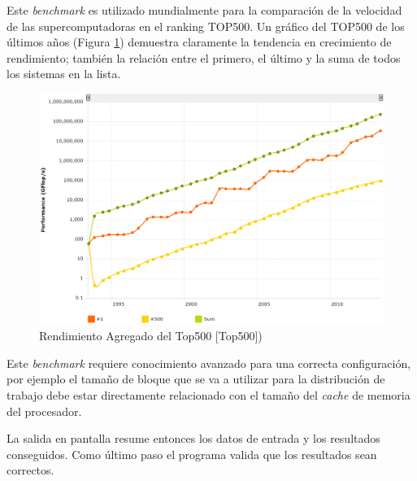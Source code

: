 \documentclass[a4paper]{report}
\begin{document}
\bigskip

Este {\it benchmark} es utilizado mundialmente para la comparación de la
velocidad de las supercomputadoras en el ranking TOP500. 
Un gráfico del TOP500 de los últimos años (Figura \ref{fig:top500}) demuestra claramente la
tendencia en crecimiento de rendimiento; también la relación entre el primero,
el último y la suma de todos los sistemas en la lista.

\begin{figure}[H]
\centering
\includegraphics[width=12cm]{top500.png}
\caption{Rendimiento Agregado del Top500 [Top500])}
\label{fig:top500}
\end{figure}

Este {\it benchmark} requiere conocimiento avanzado para una correcta configuración,
por ejemplo el tamaño de bloque que se va a utilizar para la distribución de trabajo
debe estar directamente relacionado con el tamaño del {\it cache} de memoria del procesador.

\bigskip

La salida en pantalla resume entonces los datos de entrada y los resultados conseguidos.
Como último paso el programa valida que los resultados sean correctos.
\end{document}
